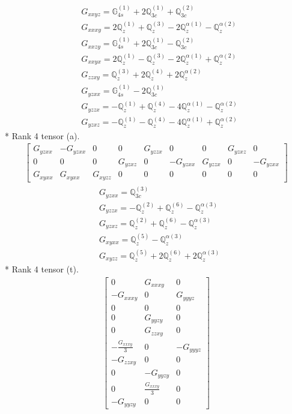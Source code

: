 \documentclass[fleqn,8pt,landscape]{jsarticle}
\begin{document}
\begin{align*}
& G_{xxyz} = \mathbb{G}_{4s}^{(1)} + 2 \mathbb{Q}_{3c}^{(1)} + \mathbb{Q}_{3c}^{(2)} \\
& G_{xxxy} = 2 \mathbb{Q}_{z}^{(1)} + \mathbb{Q}_{z}^{(3)} - 2 \mathbb{Q}_{z}^{\alpha(1)} - \mathbb{Q}_{z}^{\alpha(2)} \\
& G_{xxzy} = \mathbb{G}_{4s}^{(1)} + 2 \mathbb{Q}_{3c}^{(1)} - \mathbb{Q}_{3c}^{(2)} \\
& G_{xxyx} = 2 \mathbb{Q}_{z}^{(1)} - \mathbb{Q}_{z}^{(3)} - 2 \mathbb{Q}_{z}^{\alpha(1)} + \mathbb{Q}_{z}^{\alpha(2)} \\
& G_{zzxy} = \mathbb{Q}_{z}^{(3)} + 2 \mathbb{Q}_{z}^{(4)} + 2 \mathbb{Q}_{z}^{\alpha(2)} \\
& G_{yzxx} = \mathbb{G}_{4s}^{(1)} - 2 \mathbb{Q}_{3c}^{(1)} \\
& G_{yzzx} = - \mathbb{Q}_{z}^{(1)} + \mathbb{Q}_{z}^{(4)} - 4 \mathbb{Q}_{z}^{\alpha(1)} - \mathbb{Q}_{z}^{\alpha(2)} \\
& G_{yzxz} = - \mathbb{Q}_{z}^{(1)} - \mathbb{Q}_{z}^{(4)} - 4 \mathbb{Q}_{z}^{\alpha(1)} + \mathbb{Q}_{z}^{\alpha(2)}
\end{align*}
* Rank 4 tensor (a).
\begin{align*}
\begin{bmatrix} G_{yzxx} & - G_{yzxx} & 0 & 0 & G_{yzzx} & 0 & 0 & G_{yzxz} & 0 \\ 0 & 0 & 0 & G_{yzxz} & 0 & - G_{yzxx} & G_{yzzx} & 0 & - G_{yzxx} \\ G_{xyxx} & G_{xyxx} & G_{xyzz} & 0 & 0 & 0 & 0 & 0 & 0 \end{bmatrix}
\end{align*}
\begin{align*}
& G_{yzxx} = \mathbb{Q}_{3c}^{(3)} \\
& G_{yzzx} = - \mathbb{Q}_{z}^{(2)} + \mathbb{Q}_{z}^{(6)} - \mathbb{Q}_{z}^{\alpha(3)} \\
& G_{yzxz} = \mathbb{Q}_{z}^{(2)} + \mathbb{Q}_{z}^{(6)} - \mathbb{Q}_{z}^{\alpha(3)} \\
& G_{xyxx} = \mathbb{Q}_{z}^{(5)} - \mathbb{Q}_{z}^{\alpha(3)} \\
& G_{xyzz} = \mathbb{Q}_{z}^{(5)} + 2 \mathbb{Q}_{z}^{(6)} + 2 \mathbb{Q}_{z}^{\alpha(3)}
\end{align*}
* Rank 4 tensor (t).
\begin{align*}
\begin{bmatrix} 0 & G_{xxxy} & 0 \\ - G_{xxxy} & 0 & G_{yyyz} \\ 0 & 0 & 0 \\ 0 & G_{yyzy} & 0 \\ 0 & G_{zzxy} & 0 \\ - \frac{G_{xxxy}}{3} & 0 & - G_{yyyz} \\ - G_{zzxy} & 0 & 0 \\ 0 & - G_{yyzy} & 0 \\ 0 & \frac{G_{xxxy}}{3} & 0 \\ - G_{yyzy} & 0 & 0 \end{bmatrix}
\end{align*}
\end{document}
